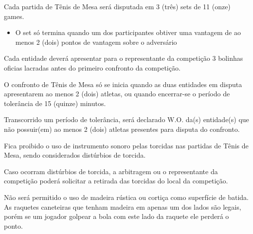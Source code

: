 \noindent
Cada partida de Tênis de Mesa será disputada em 3 (três) sets de 11 (onze) games.
\begin{itemize}[noitemsep]
	\item O set só termina quando um dos participantes obtiver uma vantagem de ao menos 2 (dois) pontos de vantagem sobre o adversário
\end{itemize}

\begin{article}
	Cada entidade deverá apresentar para o representante da competição 3 bolinhas oficias lacradas antes do primeiro confronto da competição.
\end{article}

\begin{article}
	O confronto de Tênis de Mesa só se inicia quando as duas entidades em disputa apresentarem ao menos 2 (dois) atletas, ou quando encerrar-se o período de tolerância de 15 (quinze) minutos.

	\begin{xparagraph}
		Transcorrido um período de tolerância, será declarado W.O. da(s) entidade(s) que não possuir(em) ao menos 2 (dois) atletas presentes para disputa do confronto.
	\end{xparagraph}
\end{article}

\begin{article}
	Fica proibido o uso de instrumento sonoro pelas torcidas nas partidas de Tênis de Mesa, sendo considerados distúrbios de torcida.

	\begin{xparagraph}
		Caso ocorram distúrbios de torcida, a arbitragem ou o representante da competição poderá solicitar a retirada das torcidas do local da competição.
	\end{xparagraph}
\end{article}

\begin{article}
	Não será permitido o uso de madeira rústica ou cortiça como superfície de batida. As raquetes caneteiras que tenham madeira em apenas um dos lados são legais, porém se um jogador golpear a bola com este lado da raquete ele perderá o ponto.
\end{article}
